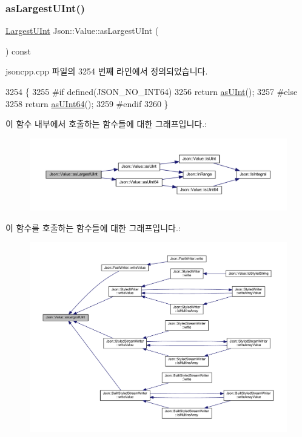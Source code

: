 \subsubsection{\texorpdfstring{as\+Largest\+U\+Int()}{asLargestUInt()}}
{\footnotesize\ttfamily \hyperlink{class_json_1_1_value_a6682a3684d635e03fc06ba229fa24eec}{Largest\+U\+Int} Json\+::\+Value\+::as\+Largest\+U\+Int (\begin{DoxyParamCaption}{ }\end{DoxyParamCaption}) const}



jsoncpp.\+cpp 파일의 3254 번째 라인에서 정의되었습니다.


\begin{DoxyCode}
3254                                        \{
3255 \textcolor{preprocessor}{#if defined(JSON\_NO\_INT64)}
3256   \textcolor{keywordflow}{return} \hyperlink{class_json_1_1_value_a74b305583ec3aacf4f9dd06e799dc265}{asUInt}();
3257 \textcolor{preprocessor}{#else}
3258   \textcolor{keywordflow}{return} \hyperlink{class_json_1_1_value_a0e44a5a4cd0c099f9570dfa25813eb60}{asUInt64}();
3259 \textcolor{preprocessor}{#endif}
3260 \}
\end{DoxyCode}
이 함수 내부에서 호출하는 함수들에 대한 그래프입니다.\+:\nopagebreak
\begin{figure}[H]
\begin{center}
\leavevmode
\includegraphics[width=350pt]{class_json_1_1_value_ad03548101e0bf3d2d9eac75c64a0b8d7_cgraph}
\end{center}
\end{figure}
이 함수를 호출하는 함수들에 대한 그래프입니다.\+:\nopagebreak
\begin{figure}[H]
\begin{center}
\leavevmode
\includegraphics[width=350pt]{class_json_1_1_value_ad03548101e0bf3d2d9eac75c64a0b8d7_icgraph}
\end{center}
\end{figure}

